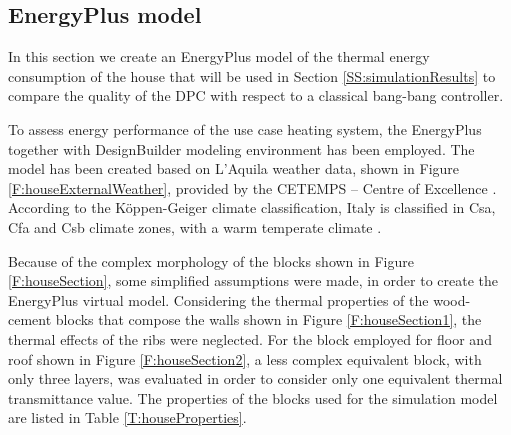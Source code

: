 \subsection{EnergyPlus model}\label{SS:energyPlusmodel}
In this section we create an EnergyPlus model of the thermal energy consumption of the house that will be used in Section \ref{SS:simulationResults} to compare the quality of the DPC with respect to a classical bang-bang controller.

To assess energy performance of the use case heating system, the EnergyPlus \cite{energyPlus} together with DesignBuilder modeling environment \cite{designBuilder} has been employed. The model has been created based  on L'Aquila weather data, shown in Figure \ref{F:houseExternalWeather}, provided by the CETEMPS – Centre of Excellence \cite{CETEMPS}. According to the K\"{o}ppen-Geiger climate classification, Italy is classified in Csa, Cfa and Csb climate zones, with a warm temperate climate \cite{Peel2007}.

Because of the complex morphology of the blocks shown in Figure \ref{F:houseSection}, some simplified assumptions were made, in order to create the EnergyPlus virtual model. Considering the thermal properties of the wood-cement blocks that compose the walls shown in Figure \ref{F:houseSection1}, the thermal effects of the ribs were neglected. For the block employed for floor and roof shown in Figure \ref{F:houseSection2}, a less complex equivalent block, with only three layers, was evaluated in order to consider only one equivalent thermal transmittance value. The properties of the blocks used for the simulation model are listed in Table \ref{T:houseProperties}.    

